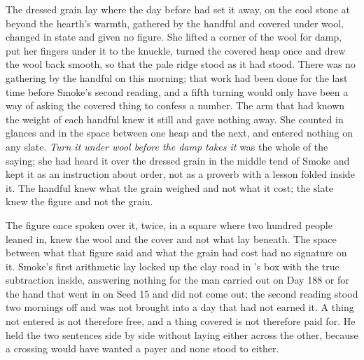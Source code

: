 \scenebreak

The dressed grain lay where the day before had set it away, on the cool stone at  beyond the hearth's warmth, gathered by the handful and covered under wool, changed in state and given no figure. She lifted a corner of the wool for damp, put her fingers under it to the knuckle, turned the covered heap once and drew the wool back smooth, so that the pale ridge stood as it had stood. There was no gathering by the handful on this morning; that work had been done for the last time before Smoke's second reading, and a fifth turning would only have been a way of asking the covered thing to confess a number. The arm that had known the weight of each handful knew it still and gave nothing away. She counted in glances and in the space between one heap and the next, and entered nothing on any slate. \emph{Turn it under wool before the damp takes it} was the whole of the saying; she had heard it over the dressed grain in the middle tend of Smoke and kept it as an instruction about order, not as a proverb with a lesson folded inside it. The handful knew what the grain weighed and not what it cost; the slate knew the figure and not the grain.

The figure once spoken over it, twice, in a square where two hundred people leaned in, knew the wool and the cover and not what lay beneath. The space between what that figure said and what the grain had cost had no signature on it. Smoke's first arithmetic lay locked up the clay road in 's box with the true subtraction inside, answering nothing for the man carried out on Day 188 or for the hand that went in on Seed 15 and did not come out; the second reading stood two mornings off and was not brought into a day that had not earned it. A thing not entered is not therefore free, and a thing covered is not therefore paid for. He held the two sentences side by side without laying either across the other, because a crossing would have wanted a payer and none stood to either.

\scenebreak

